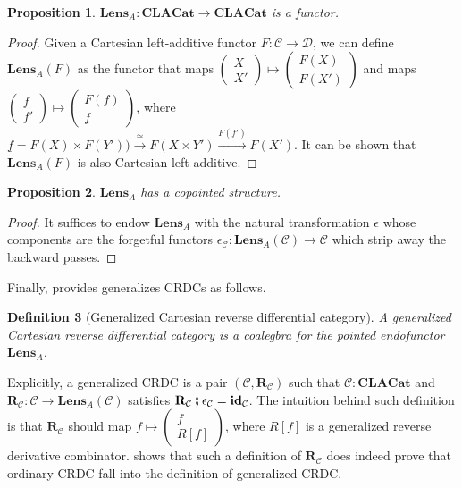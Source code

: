 \documentclass[12pt,a4paper,openright,twoside]{report}
\theoremstyle{plain}
\newtheorem{proposition}{Proposition}
\newtheorem{definition}[proposition]{Definition}
\theoremstyle{definition}
\begin{document}
\begin{proposition}
  $\mathbf{Lens}_A: \mathbf{CLACat} \to \mathbf{CLACat}$ is a functor.
\end{proposition}
\begin{proof}
  Given a Cartesian left-additive functor $F: \mathcal{C} \to \mathcal{D}$, we can define $\mathbf{Lens}_A(F)$ as the functor that maps $\left(\begin{smallmatrix}X  \\ X' \end{smallmatrix}\right) \mapsto \left(\begin{smallmatrix} F(X) \\ F(X') \end{smallmatrix}\right)$ and maps $\left(\begin{smallmatrix}f  \\ f' \end{smallmatrix}\right) \mapsto \left(\begin{smallmatrix} F(f) \\ \underline{f} \end{smallmatrix}\right)$, where $\underline{f} = F(X) \times F(Y')) \stackrel{\cong}{\longrightarrow} F(X \times Y') \stackrel{F(f')}{\longrightarrow}F(X')$. It can be shown that $\mathbf{Lens}_A(F)$ is also Cartesian left-additive.
\end{proof}

\begin{proposition}
  $\mathbf{Lens}_A$ has a copointed structure.
\end{proposition}
\begin{proof}
  It suffices to endow $\mathbf{Lens}_A$ with the natural transformation $\epsilon$ whose components are the forgetful functors $\epsilon_{\mathcal{C}}: \mathbf{Lens}_A(\mathcal{C}) \to \mathcal{C}$ which strip away the backward passes.
\end{proof}

Finally, \cite{gavranovic2024fundamental} provides generalizes CRDCs as follows.

\begin{definition}[Generalized Cartesian reverse differential category]
  A generalized Cartesian reverse differential category is a coalegbra for the pointed endofunctor $\mathbf{Lens}_A$. 
\end{definition}

Explicitly, a generalized CRDC is a pair $(\mathcal{C}, \mathbf{R}_{\mathcal{C}})$ such that $\mathcal{C}: \mathbf{CLACat}$ and $\mathbf{R}_{\mathcal{C}}: \mathcal{C} \to \mathbf{Lens}_A(\mathcal{C})$ satisfies $\mathbf{R}_{\mathcal{C}} \fatsemi \epsilon_{\mathcal{C}} = \mathbf{id}_{\mathcal{C}}$. The intuition behind such definition is that $\mathbf{R}_{\mathcal{C}}$ should map $f \mapsto \left(\begin{smallmatrix} f \\ R[f] \end{smallmatrix}\right)$, where $R[f]$ is a generalized reverse derivative combinator. \cite{gavranovic2024fundamental} shows that such a definition of $\mathbf{R}_{\mathcal{C}}$ does indeed prove that ordinary CRDC fall into the definition of generalized CRDC. 
\end{document}
